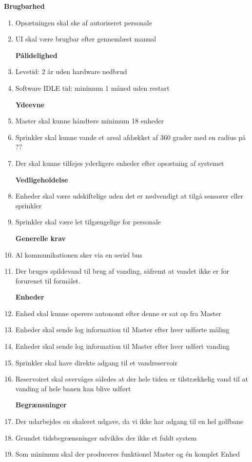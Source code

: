 

\large {\textbf{Brugbarhed}}
\begin{enumerate}
\item Opsætningen skal ske af autoriseret personale
\item UI skal være brugbar efter gennemlæst manual


\large{\textbf{Pålidelighed}}
\item Levetid: 2 år uden hardware nedbrud
\item Software IDLE tid: minimum 1 måned uden restart


\large{\textbf{Ydeevne}}
\item Master skal kunne håndtere minimum 18 enheder
\item Sprinkler skal kunne vande et areal afdækket af 360 grader med en radius på ??
\item Der skal kunne tilføjes yderligere enheder efter opsætning af systemet


\large{\textbf{Vedligeholdelse}}
\item Enheder skal være udskiftelige uden det er nødvendigt at tilgå sensorer eller sprinkler
\item Sprinkler skal være let tilgængelige for personale


\large{\textbf{Generelle krav}}
\item Al kommunikationen sker via en seriel bus 
\item Der bruges spildevand til brug af vanding, såfremt at vandet ikke er for forurenet til formålet. 


\large{\textbf{Enheder}}
\item Enhed skal kunne operere autonomt efter denne er sat op fra Master
\item Enheder skal sende log information til Master efter hver udførte måling
\item Enheder skal sende log information til Master efter hver udført vanding
\item Sprinkler skal have direkte adgang til et vandreservoir 
\item Reservoiret skal overvåges således at der hele tiden er tilstrækkelig vand til at vanding af hele banen kan blive udført


\large{\textbf{Begrænsninger}}
\item Der udarbejdes en skaleret udgave, da vi ikke har adgang til en hel golfbane
\item Grundet tidsbegrænsninger udvikles der ikke et fuldt system 
\item Som minimum skal der produceres funktionel Master og én komplet Enhed
\end{enumerate}


